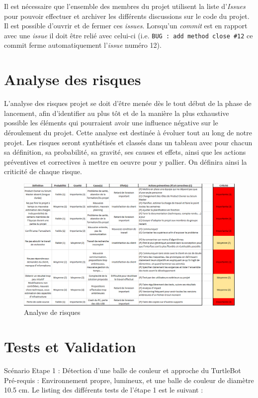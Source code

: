 \documentclass[10pt,a4paper]{article}
\begin{document}
Il est nécessaire que l'ensemble des membres du projet utilisent la liste d'\textit{Issues} pour pouvoir effectuer et archiver les différents discussions sur le code du projet. Il est possible d'ouvrir et de fermer ces \textit{issues}. Lorsqu'un \textit{commit} est en rapport avec une \textit{issue} il doit être relié avec celui-ci (i.e. \verb|BUG : add method close #12| ce commit ferme automatiquement l'\textit{issue} numéro 12).


\section{Analyse des risques}
L’analyse des risques projet se doit d’être menée dès le tout début de la phase de lancement, afin d’identifier au plus tôt et de la manière la plus exhaustive possible les éléments qui pourraient avoir une influence négative sur le déroulement du projet. Cette analyse est destinée à évoluer tout au long de notre projet.
Les risques seront synthétisés et classés dans un tableau avec pour chacun sa définition, sa probabilité,
sa gravité, ses causes et effets, ainsi que les actions préventives et correctives à mettre en oeuvre pour y pallier. On définira ainsi la criticité de chaque risque.

\begin{figure}
  \centering
\noindent\includegraphics[width=\textwidth]{risques.png} 
  \caption{Analyse de risques}
\end{figure}

\section{Tests et Validation}
Scénario Etape 1 : Détection d'une balle de couleur et approche du TurtleBot
Pré-requis :  Environnement propre, lumineux,  et une balle de couleur de diamètre 10.5 cm.
Le listing des différents tests de l'étape 1 est le suivant :
\end{document}
